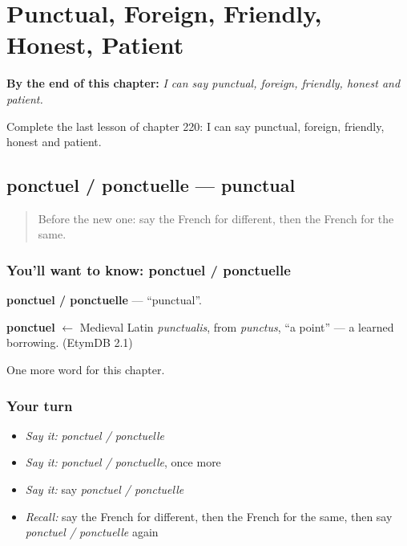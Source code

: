 
\chapter{Punctual, Foreign, Friendly, Honest, Patient}
\label{ch:fr-punctual-foreign-friendly-honest-patient}

\begin{chapteropening}
\textbf{By the end of this chapter:} \emph{I can say punctual, foreign, friendly, honest and patient.}

Complete the last lesson of chapter 220: I can say punctual, foreign, friendly, honest and patient.
\end{chapteropening}

\section[ponctuel / ponctuelle]{ponctuel / ponctuelle — punctual}

\label{lesson:FR-C220-ponctuel-ponctuelle}



\begin{quote}
Before the new one: say the French for different, then the French for the same.
\end{quote}

\subsection*{You'll want to know: ponctuel / ponctuelle}
\textbf{ponctuel / ponctuelle} — \textquotedblleft{}punctual\textquotedblright{}.

\begin{cousinweb}
\textbf{ponctuel} $\leftarrow$ Medieval Latin \emph{punctualis}, from \emph{punctus}, \textquotedblleft{}a point\textquotedblright{} — a learned borrowing. (EtymDB 2.1)
\end{cousinweb}

\begin{grammarlens}[title={What you've built}]
One more word for this chapter.
\end{grammarlens}

\subsection*{Your turn}
\begin{itemize}
\raggedright
  \item \emph{Say it:} \emph{ponctuel / ponctuelle}
  \item \emph{Say it:} \emph{ponctuel / ponctuelle}, once more
  \item \emph{Say it:} say \emph{ponctuel / ponctuelle}
  \item \emph{Recall:} say the French for different, then the French for the same, then say \emph{ponctuel / ponctuelle} again
\end{itemize}

